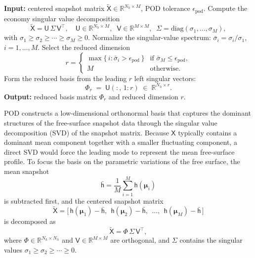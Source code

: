 \documentclass{elsarticle}
\newcommand{\mat}[1]{\mathsf{#1}}
\newcommand{\params}{\boldsymbol{\mu}}
\begin{document}
\begin{algorithm}[!ht]
\caption{POD basis construction.}
\label{alg:SVD}
\begin{algorithmic}[1]
\State \textbf{Input:} centered snapshot matrix
$\tilde{\mat{X}} \in \mathbb{R}^{N_h \times M}$,
POD tolerance $\epsilon_{\mathrm{pod}}$.
\State Compute the economy singular value decomposition
\begin{equation*}
\tilde{\mat{X}} = \mat{U}\,\mat{\Sigma}\,\mat{V}^{\top},
\quad
\mat{U} \in \mathbb{R}^{N_h \times M},\;\;
\mat{V} \in \mathbb{R}^{M \times M},\;\;
\mat{\Sigma} = \mathrm{diag}(\sigma_1,\dots,\sigma_M),
\end{equation*}
with $\sigma_1 \ge \sigma_2 \ge \cdots \ge \sigma_M \ge 0$.
\State Normalize the singular-value spectrum:
$\bar{\sigma}_i = \sigma_i / \sigma_1$, $i = 1,\dots,M$.
\State Select the reduced dimension
\[
r =
\begin{cases}
\max\{\, i : \bar{\sigma}_i > \epsilon_{\mathrm{pod}} \,\} & \text{if } \bar{\sigma}_M \le \epsilon_{\mathrm{pod}}, \\
M & \text{otherwise.}
\end{cases}
\]
\State Form the reduced basis from the leading $r$ left singular vectors:
\[
\mat{\Phi}_r \;=\; \mat{U}(:,\,1\!:\!r) \;\in\; \mathbb{R}^{N_h \times r}.
\]
\State \textbf{Output:} reduced basis matrix $\mat{\Phi}_r$ and reduced dimension $r$.
\end{algorithmic}
\end{algorithm}
POD constructs a low-dimensional orthonormal basis that captures the
dominant structures of the free-surface snapshot data through the singular
value decomposition (SVD) of the snapshot matrix. Because $\mat{X}$
typically contains a dominant mean component together with a smaller
fluctuating component, a direct SVD would force the leading mode to
represent the mean free-surface profile. To focus the basis on the
parametric variations of the free surface, the mean snapshot
\[
\bar{\mat{h}} = \frac{1}{M}\sum_{i=1}^{M} \mat{h}(\params_i)
\]
is subtracted first, and the centered snapshot matrix
\begin{equation}
\tilde{\mat{X}} =
\bigl[\, \mat{h}(\params_1) - \bar{\mat{h}},\;\, \mat{h}(\params_2) - \bar{\mat{h}},\;\, \dots,\;\, \mat{h}(\params_M) - \bar{\mat{h}} \,\bigr]
\end{equation}
is decomposed as
\begin{equation}
\tilde{\mat{X}} = \mat{\Phi}\,\mat{\Sigma}\,\mat{V}^{\top},
\end{equation}
where $\mat{\Phi} \in \mathbb{R}^{N_h \times N_h}$ and $\mat{V} \in \mathbb{R}^{M \times M}$ are orthogonal, and $\mat{\Sigma}$ contains the singular values $\sigma_1 \ge \sigma_2 \ge \cdots \ge 0$.
\end{document}

